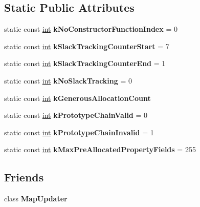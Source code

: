 \subsection*{Static Public Attributes}
\begin{DoxyCompactItemize}
\item 
\mbox{\label{classv8_1_1internal_1_1Map_afc8dc4de958e145987be19341a22c338}} 
static const \mbox{\hyperlink{classint}{int}} {\bfseries k\+No\+Constructor\+Function\+Index} = 0
\item 
\mbox{\label{classv8_1_1internal_1_1Map_a2a0fc5e7e78b7cba657d1888f3448bae}} 
static const \mbox{\hyperlink{classint}{int}} {\bfseries k\+Slack\+Tracking\+Counter\+Start} = 7
\item 
\mbox{\label{classv8_1_1internal_1_1Map_a679d4c0a8adf5810eec6f7126bd50c7a}} 
static const \mbox{\hyperlink{classint}{int}} {\bfseries k\+Slack\+Tracking\+Counter\+End} = 1
\item 
\mbox{\label{classv8_1_1internal_1_1Map_a2a2d69d6abc592918fe00f31f4d32a74}} 
static const \mbox{\hyperlink{classint}{int}} {\bfseries k\+No\+Slack\+Tracking} = 0
\item 
static const \mbox{\hyperlink{classint}{int}} {\bfseries k\+Generous\+Allocation\+Count}
\item 
\mbox{\label{classv8_1_1internal_1_1Map_a1687713a44c12c6eabc699bba2f4a917}} 
static const \mbox{\hyperlink{classint}{int}} {\bfseries k\+Prototype\+Chain\+Valid} = 0
\item 
\mbox{\label{classv8_1_1internal_1_1Map_a590806059e1dba905eaf67367f03d376}} 
static const \mbox{\hyperlink{classint}{int}} {\bfseries k\+Prototype\+Chain\+Invalid} = 1
\item 
\mbox{\label{classv8_1_1internal_1_1Map_ad878be44f72b34291a3995a9a9c4783d}} 
static const \mbox{\hyperlink{classint}{int}} {\bfseries k\+Max\+Pre\+Allocated\+Property\+Fields} = 255
\end{DoxyCompactItemize}
\subsection*{Friends}
\begin{DoxyCompactItemize}
\item 
\mbox{\label{classv8_1_1internal_1_1Map_a36006e16ddd285384c594cb01db0a9fb}} 
class {\bfseries Map\+Updater}
\end{DoxyCompactItemize}
